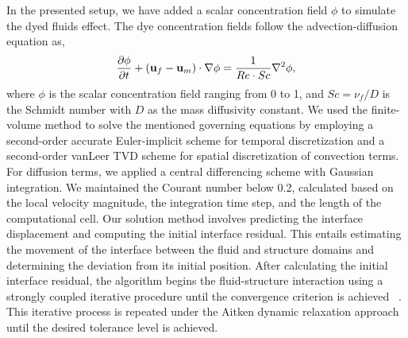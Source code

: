 \documentclass[reprint,a4paper,fleqn]{cas-dc} %
\begin{document}
		In the presented setup, we have added a scalar concentration field $\phi$ to simulate the dyed fluids effect. The dye concentration fields follow the advection-diffusion equation as,
		\begin{equation}
			{\partial\phi\over\partial t}+(\mathbf{u}_f-\mathbf{u}_m)\cdot\mathbf{\nabla}\mathbf{\phi} = \frac{1}{Re\cdot Sc}\nabla^2\mathbf{\phi},
		\end{equation}
		where $\phi$ is the scalar concentration field ranging from 0 to 1, and $Sc=\nu_f/D$ is the Schmidt number with $D$ as the mass diffusivity constant. 	
		We used the finite-volume method to solve the mentioned governing equations by employing a second-order accurate Euler-implicit scheme for temporal discretization and a second-order vanLeer TVD scheme for spatial discretization of convection terms. For diffusion terms, we applied a central differencing scheme with Gaussian integration. We maintained the Courant number below 0.2, calculated based on the local velocity magnitude, the integration time step, and the length of the computational cell. Our solution method involves predicting the interface displacement and computing the initial interface residual. This entails estimating the movement of the interface between the fluid and structure domains and determining the deviation from its initial position. After calculating the initial interface residual, the algorithm begins the fluid-structure interaction using a strongly coupled iterative procedure until the convergence criterion is achieved ~\citep{Hrvoje2007, CampbellPaterson2011}. This iterative process is repeated under the Aitken dynamic relaxation approach until the desired tolerance level is achieved.
		
\end{document}
